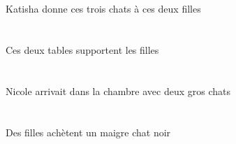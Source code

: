 \begin{exe}
\INDSgErgP{}   \KatishaASgErgP{}    \DEMDuDatP{}   \filleCDuDatP{}   \DEMPlAbsP{}   \troisDPlP{}   \chatDPlAbsP{}  \donnerVdPrsDPlP{}\\
\INDSgErgG{}   \KatishaASgErgG{}    \DEMDuDatG{}   \filleCDuDatG{}   \DEMPlAbsG{}   \troisDPlG{}   \chatDPlAbsG{}  \donnerVdPrsDPlG{}\\
Katisha donne ces trois chats à ces deux filles
\ex\glll
\DEMDuErg{}   \tableCDuErg{}   \DEFPlAbs{}   \filleCPlAbs{}  \supporterVtPrsCPl{}\\
\DEMDuErgP{}   \tableCDuErgP{}   \DEFPlAbsP{}   \filleCPlAbsP{}  \supporterVtPrsCPlP{}\\
\DEMDuErgG{}   \tableCDuErgG{}   \DEFPlAbsG{}   \filleCPlAbsG{}  \supporterVtPrsCPlG{}\\
Ces deux tables supportent les filles
\ex\glll
\INDDuObl{}   \grosDDu{}   \chatDDuObl{}   \AVEC{}   \INDSgAbs{}   \NicoleDSgAbs{}    \DEFSgObl{}   \chambreBSgObl{}   \DANS{}  \arriverViPstDSg{}\\
\INDDuOblP{}   \grosDDuP{}   \chatDDuOblP{}   \AVECP{}   \INDSgAbsP{}   \NicoleDSgAbsP{}    \DEFSgOblP{}   \chambreBSgOblP{}   \DANSP{}  \arriverViPstDSgP{}\\
\INDDuOblG{}   \grosDDuG{}   \chatDDuOblG{}   \AVECG{}   \INDSgAbsG{}   \NicoleDSgAbsG{}    \DEFSgOblG{}   \chambreBSgOblG{}   \DANSG{}  \arriverViPstDSgG{}\\
Nicole arrivait dans la chambre avec deux gros chats
\ex\glll
\INDPlErg{}   \filleCPlErg{}   \INDSgAbs{}   \maigreDSg{}   \noirDSg{}   \chatDSgAbs{}  \acheterVtPrsDSg{}\\
\INDPlErgP{}   \filleCPlErgP{}   \INDSgAbsP{}   \maigreDSgP{}   \noirDSgP{}   \chatDSgAbsP{}  \acheterVtPrsDSgP{}\\
\INDPlErgG{}   \filleCPlErgG{}   \INDSgAbsG{}   \maigreDSgG{}   \noirDSgG{}   \chatDSgAbsG{}  \acheterVtPrsDSgG{}\\
Des filles achètent un maigre chat noir
\ex\glll
\DEFSgObl{}    \DEFSgObl{}   \cuisineCSgObl{}   \DEVANT{}   \plaineCSgObl{}   \DANS{}   \INDSgErg{}   \grandCSg{}   \chasseurCSgErg{}    \INDSgDat{}   \NabilBSgDat{}   \INDSgAbs{}   \petitASg{}   \coyoteASgAbs{}  \montrerVdPstASg{}\\
\DEFSgOblP{}    \DEFSgOblP{}   \cuisineCSgOblP{}   \DEVANTP{}   \plaineCSgOblP{}   \DANSP{}   \INDSgErgP{}   \grandCSgP{}   \chasseurCSgErgP{}    \INDSgDatP{}   \NabilBSgDatP{}   \INDSgAbsP{}   \petitASgP{}   \coyoteASgAbsP{}  \montrerVdPstASgP{}\\
\DEFSgOblG{}    \DEFSgOblG{}   \cuisineCSgOblG{}   \DEVANTG{}   \plaineCSgOblG{}   \DANSG{}   \INDSgErgG{}   \grandCSgG{}   \chasseurCSgErgG{}    \INDSgDatG{}   \NabilBSgDatG{}   \INDSgAbsG{}   \petitASgG{}   \coyoteASgAbsG{}  \montrerVdPstASgG{}\\

\end{exe}
